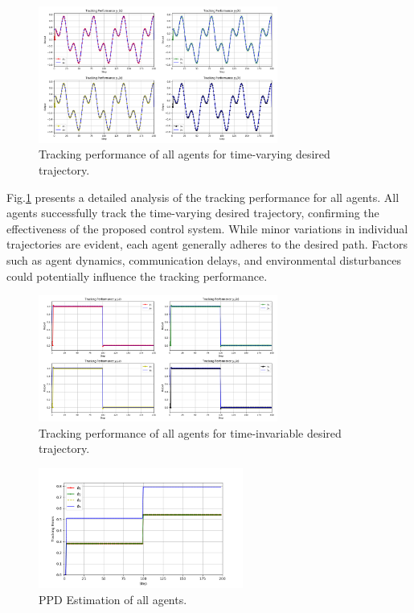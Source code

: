 \documentclass[journal,onecolumn]{IEEEtran}
\begin{document}
\begin{figure}[h!]
    \centering
    \includegraphics[width=0.7\textwidth]{Figure_1.png}
    \caption{Tracking performance of all agents for time-varying desired trajectory.}
    \label{fig:figure_3} %
\end{figure}

Fig.\ref{fig:figure_3} presents a detailed analysis of the tracking performance for all agents. All agents successfully track the time-varying desired trajectory, confirming the effectiveness of the proposed control system. While minor variations in individual trajectories are evident, each agent generally adheres to the desired path. Factors such as agent dynamics, communication delays, and environmental disturbances could potentially influence the tracking performance.

\begin{figure}[h!]
    \centering
    \includegraphics[width=0.7\textwidth]{Figure_4.png}
    \caption{Tracking performance of all agents for time-invariable desired trajectory.}
    \label{fig:figure_4} %
\end{figure}

\begin{figure}[h!]
    \centering
    \includegraphics[width=0.6\textwidth]{Figure_5.png}
    \caption{PPD Estimation of all agents.}
    \label{fig:figure_5} %
\end{figure}
\end{document}
